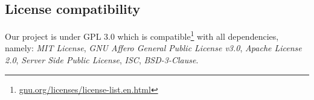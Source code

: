 \subsection{License compatibility}
Our project is under GPL 3.0 which is compatible\footnote{\href{https://www.gnu.org/licenses/license-list.en.html}{gnu.org/licenses/license-list.en.html}} with all dependencies, namely: \textit{MIT License}, \textit{GNU Affero General Public License v3.0}, \textit{Apache License 2.0}, \textit{Server Side Public License}, \textit{ISC}, \textit{BSD-3-Clause}. 

